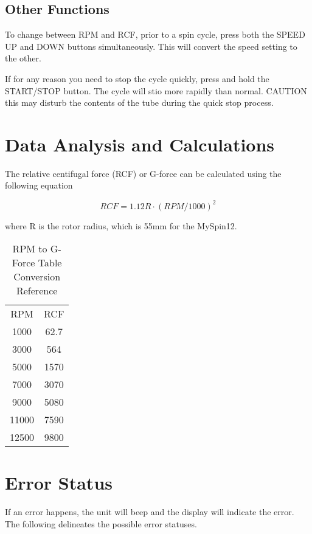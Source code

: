 \documentclass[12pt]{../SOP3_beta}\usepackage[]{graphicx}\usepackage[]{color}
\begin{document}
\subsection*{Other Functions}

\NP To change between RPM and RCF, prior to a spin cycle, press both the SPEED UP and DOWN buttons simultaneously. This will convert the speed setting to the other.

\NP If for any reason you need to stop the cycle quickly, press and hold the START/STOP button. The cycle will stio more rapidly than normal. CAUTION this may disturb the contents of the tube during the quick stop process.  

\section{Data Analysis and Calculations}

\NP The relative centifugal force (RCF) or G-force can be calculated using the following equation

\begin{equation}
RCF = 1.12 R \cdot (RPM/1000)^2
\end{equation}

\noindent where R is the rotor radius, which is 55mm for the MySpin12.

\begin{table}[h]
\centering
\caption{RPM to G-Force Table Conversion Reference}
\begin{tabular}{cc}
RPM   &   RCF   \\
1000  &   62.7          \\
3000  &   564           \\
5000  &   1570          \\
7000  &   3070          \\
9000  &   5080          \\
11000 &   7590          \\
12500 &   9800          \\
\end{tabular}
\end{table}

\section{Error Status}

\NP If an error happens, the unit will beep and the display will indicate the error. The following delineates the possible error statuses. 
\end{document}
